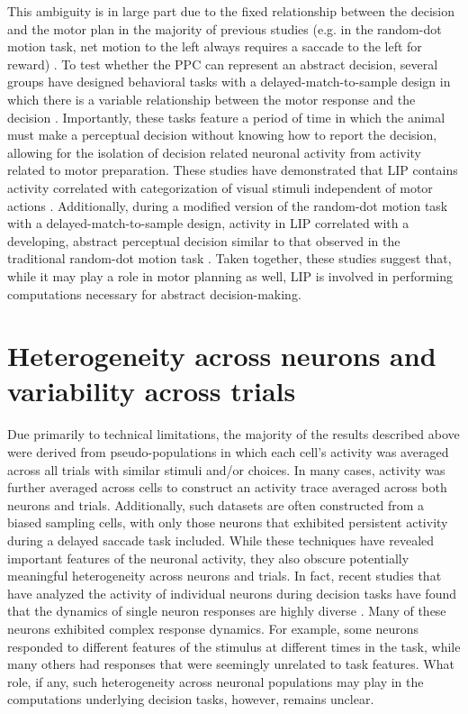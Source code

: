 \bigskip
This ambiguity is in large part due to the fixed relationship between the decision and the motor plan in the majority of previous studies (e.g. in the random-dot motion task, net motion to the left always requires a saccade to the left for reward) \citep{Freedman:2011hq}. To test whether the PPC can represent an abstract decision, several groups have designed behavioral tasks with a delayed-match-to-sample design in which there is a variable relationship between the motor response and the decision \citep{Freedman:2006hd, Fitzgerald:2011fu, Bennur:2011gx}. Importantly, these tasks feature a period of time in which the animal must make a perceptual decision without knowing how to report the decision, allowing for the isolation of decision related neuronal activity from activity related to motor preparation. These studies have demonstrated that LIP contains activity correlated with categorization of visual stimuli independent of motor actions \citep{Freedman:2006hd, Fitzgerald:2011fu}. Additionally, during a modified version of the random-dot motion task with a delayed-match-to-sample design, activity in LIP correlated with a developing, abstract perceptual decision similar to that observed in the traditional random-dot motion task \citep{Bennur:2011gx}. Taken together, these studies suggest that, while it may play a role in motor planning as well, LIP is involved in performing computations necessary for abstract decision-making. 

\section{Heterogeneity across neurons and variability across trials} \label{intro:heterogeneity}

Due primarily to technical limitations, the majority of the results described above were derived from pseudo-populations in which each cell’s activity was averaged across all trials with similar stimuli and/or choices. In many cases, activity was further averaged across cells to construct an activity trace averaged across both neurons and trials. Additionally, such datasets are often constructed from a biased sampling cells, with only those neurons that exhibited persistent activity during a delayed saccade task included. While these techniques have revealed important features of the neuronal activity, they also obscure potentially meaningful heterogeneity across neurons and trials. In fact, recent studies that have analyzed the activity of individual neurons during decision tasks have found that the dynamics of single neuron responses are highly diverse \citep{Meister:2013ca, Park:2014co, Jun:2010kj, Raposo:2014df, Mante:2013ie, Rigotti:2013bo}. Many of these neurons exhibited complex response dynamics. For example, some neurons responded to different features of the stimulus at different times in the task, while many others had responses that were seemingly unrelated to task features. What role, if any, such heterogeneity across neuronal populations may play in the computations underlying decision tasks, however, remains unclear. 

